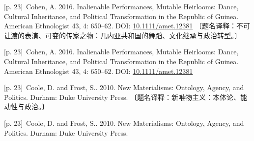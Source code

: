 \documentclass[10pt,a4paper]{article}
\begin{document}
\noindent\begin{minipage}{\textwidth}\begin{minipage}[t]{\dimexpr.5\textwidth-4mm\relax}\noindent\begin{minipage}[t]{\linewidth}{\scriptsize\color{gray} [p. 23]}\ Cohen, A. 2016. Inalienable Performances, Mutable Heirlooms: Dance, Cultural Inheritance, and Political Transformation in the Republic of Guinea. American Ethnologist 43, 4: 650–62. DOI: \url{10.1111/amet.12381} 〔题名译释：不可让渡的表演、可变的传家之物：几内亚共和国的舞蹈、文化继承与政治转型。〕\par\end{minipage}\par\end{minipage}\hfill\begin{minipage}[t]{\dimexpr.5\textwidth-4mm\relax}\noindent\begin{minipage}[t]{\linewidth}{\scriptsize\color{gray} [p. 23]}\ Cohen, A. 2016. Inalienable Performances, Mutable Heirlooms: Dance, Cultural Inheritance, and Political Transformation in the Republic of Guinea. American Ethnologist 43, 4: 650–62. DOI: \url{10.1111/amet.12381}\par\end{minipage}\par\end{minipage}\end{minipage}\par
\noindent\begin{minipage}{\textwidth}\begin{minipage}[t]{\dimexpr.5\textwidth-4mm\relax}\noindent\begin{minipage}[t]{\linewidth}{\scriptsize\color{gray} [p. 23]}\ Coole, D. and Frost, S.. 2010. New Materialisms: Ontology, Agency, and Politics. Durham: Duke University Press. 〔题名译释：新唯物主义：本体论、能动性与政治。〕\par\end{minipage}\par\end{minipage}\hfill\begin{minipage}[t]{\dimexpr.5\textwidth-4mm\relax}\noindent\begin{minipage}[t]{\linewidth}{\scriptsize\color{gray} [p. 23]}\ Coole, D. and Frost, S.. 2010. New Materialisms: Ontology, Agency, and Politics. Durham: Duke University Press.\par\end{minipage}\par\end{minipage}\end{minipage}\par
\end{document}
